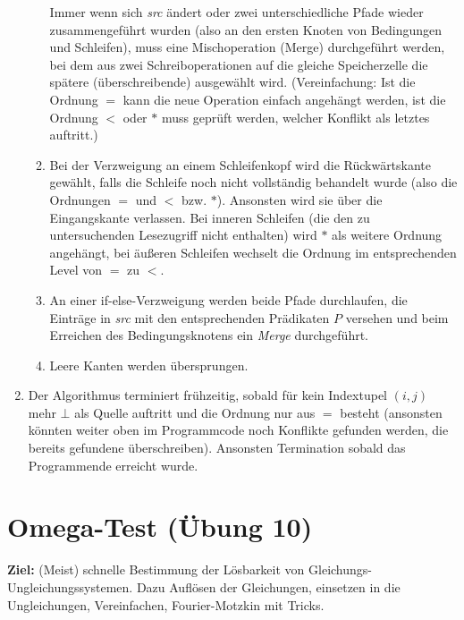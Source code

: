 \documentclass[a4paper,10pt]{article}
\begin{document}
\begin{enumerate}
\begin{enumerate}
                Immer wenn sich \textit{src} ändert oder zwei unterschiedliche Pfade wieder zusammengeführt wurden (also an den ersten Knoten von Bedingungen und Schleifen), muss eine Mischoperation (Merge) durchgeführt werden, bei dem aus zwei Schreiboperationen auf die gleiche Speicherzelle die spätere (überschreibende) ausgewählt wird. (Vereinfachung: Ist die Ordnung $=$ kann die neue Operation einfach angehängt werden, ist die Ordnung $<$ oder $*$ muss geprüft werden, welcher Konflikt als letztes auftritt.)
            \item Bei der Verzweigung an einem Schleifenkopf wird die Rückwärtskante gewählt, falls die Schleife noch nicht vollständig behandelt wurde (also die Ordnungen $=$ und $<$ bzw. $*$). Ansonsten wird sie über die Eingangskante verlassen. Bei inneren Schleifen (die den zu untersuchenden Lesezugriff nicht enthalten) wird $*$ als weitere Ordnung angehängt, bei äußeren Schleifen wechselt die Ordnung im entsprechenden Level von $=$ zu $<$.
            \item An einer if-else-Verzweigung werden beide Pfade durchlaufen, die Einträge in \textit{src} mit
                den entsprechenden Prädikaten $P$ versehen und beim Erreichen des Bedingungsknotens ein \textit{Merge} durchgeführt.
            \item Leere Kanten werden übersprungen.
        \end{enumerate}
    \item Der Algorithmus terminiert frühzeitig, sobald für kein Indextupel $(i,j)$ mehr $\bot$ als Quelle auftritt und die Ordnung nur aus $=$ besteht (ansonsten könnten weiter oben im Programmcode noch Konflikte gefunden werden, die bereits gefundene überschreiben). Ansonsten Termination sobald das Programmende erreicht wurde.
\end{enumerate}

\section{Omega-Test (Übung 10)}

\textbf{Ziel:} (Meist) schnelle Bestimmung der Lösbarkeit von Gleichungs-Ungleichungssystemen. Dazu Auflösen der Gleichungen, einsetzen in die Ungleichungen, Vereinfachen, Fourier-Motzkin mit Tricks.
\end{document}

